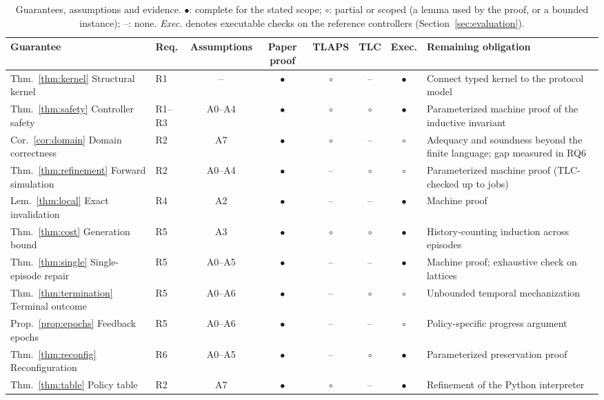 \begin{table}[!t]
\centering
\caption{Guarantees, assumptions and evidence. $\bullet$: complete for the stated scope; $\circ$: partial or scoped (a lemma used by the proof, or a bounded instance); --: none. \emph{Exec.} denotes executable checks on the reference controllers (Section~\ref{sec:evaluation}).}\label{tab:evidence}
\footnotesize\setlength{\tabcolsep}{4pt}
\begin{tabular}{@{}llcccccP{56mm}@{}}\toprule
Guarantee & Req. & Assumptions & Paper proof & TLAPS & TLC & Exec. & Remaining obligation\\\midrule
Thm.~\ref{thm:kernel} Structural kernel & R1 & -- & $\bullet$ & $\circ$ & -- & $\bullet$ & Connect typed kernel to the protocol model\\
Thm.~\ref{thm:safety} Controller safety & R1--R3 & A0--A4 & $\bullet$ & $\circ$ & $\circ$ & $\bullet$ & Parameterized machine proof of the inductive invariant\\
Cor.~\ref{cor:domain} Domain correctness & R2 & A7 & $\bullet$ & $\circ$ & -- & $\circ$ & Adequacy and soundness beyond the finite language; gap measured in RQ6\\
Thm.~\ref{thm:refinement} Forward simulation & R2 & A0--A4 & $\bullet$ & -- & $\circ$ & $\circ$ & Parameterized machine proof (TLC-checked up to \TLCExtMaxJobs{} jobs)\\
Lem.~\ref{thm:local} Exact invalidation & R4 & A2 & $\bullet$ & -- & -- & $\bullet$ & Machine proof\\
Thm.~\ref{thm:cost} Generation bound & R5 & A3 & $\bullet$ & $\circ$ & $\circ$ & $\bullet$ & History-counting induction across episodes\\
Thm.~\ref{thm:single} Single-episode repair & R5 & A0--A5 & $\bullet$ & -- & -- & $\bullet$ & Machine proof; exhaustive check on lattices\\
Thm.~\ref{thm:termination} Terminal outcome & R5 & A0--A6 & $\bullet$ & -- & $\circ$ & $\circ$ & Unbounded temporal mechanization\\
Prop.~\ref{prop:epochs} Feedback epochs & R5 & A0--A6 & $\bullet$ & -- & -- & $\circ$ & Policy-specific progress argument\\
Thm.~\ref{thm:reconfig} Reconfiguration & R6 & A0--A5 & $\bullet$ & -- & $\circ$ & $\bullet$ & Parameterized preservation proof\\
Thm.~\ref{thm:table} Policy table & R2 & A7 & $\bullet$ & $\circ$ & -- & $\bullet$ & Refinement of the Python interpreter\\\bottomrule
\end{tabular}
\end{table}
